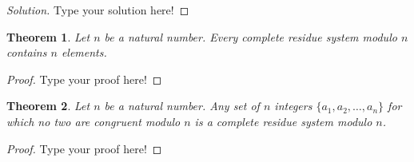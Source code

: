 \documentclass[12pt,leqno]{article}
\numberwithin{equation}{section}
\newtheorem{thm}{Theorem}[section]
\theoremstyle{definition}
\begin{document}
\begin{proof}[Solution]
Type your solution here!
\end{proof}


\begin{thm}
Let $n$ be a natural number. Every complete residue system modulo
$n$ contains $n$ elements.
\end{thm}

\begin{proof}[Proof]
Type your proof here!
\end{proof}


\begin{thm}
Let $n$ be a natural number. Any set of $n$ integers $\{a_1, a_2,
\hdots, a_n\}$ for which no two are congruent modulo $n$ is a
complete residue system modulo $n$.
\end{thm}

\begin{proof}[Proof]
Type your proof here!
\end{proof}
\end{document}
